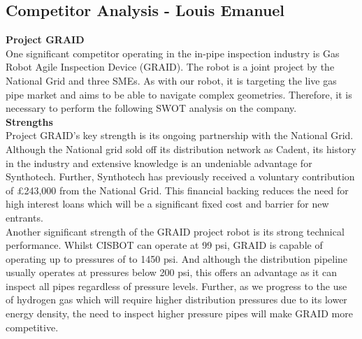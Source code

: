 \documentclass[11pt]{article}		%
\begin{document}
		\subsection[Competitor Analysis]{Competitor Analysis - Louis Emanuel}
		
		\textbf{Project GRAID}\\
		One significant competitor operating in the in-pipe inspection industry is Gas Robot Agile Inspection Device (GRAID). The robot is a joint project by the National Grid and three SMEs. As with our robot, it is targeting the live gas pipe market and aims to be able to navigate complex geometries. Therefore, it is necessary to perform the following SWOT analysis on the company. \\
		
		\textbf{Strengths} \\
		Project GRAID's key strength is its ongoing partnership with the National Grid. Although the National grid sold off its distribution network as Cadent, its history in the industry and extensive knowledge is an undeniable advantage for Synthotech. Further, Synthotech has previously received a voluntary contribution of £243,000 from the National Grid. This financial backing reduces the need for high interest loans which will be a significant fixed cost and barrier for new entrants. \\
	    \hspace*{3ex}Another significant strength of the GRAID project robot is its strong technical performance. Whilst CISBOT can operate at 99 psi, GRAID is capable of operating up to pressures of to 1450 psi. And although the distribution pipeline usually operates at pressures below 200 psi, this offers an advantage as it can inspect all pipes regardless of pressure levels. Further, as we progress to the use of hydrogen gas which will require higher distribution pressures due to its lower energy density, the need to inspect higher pressure pipes will make GRAID more competitive. 
        
\end{document}

